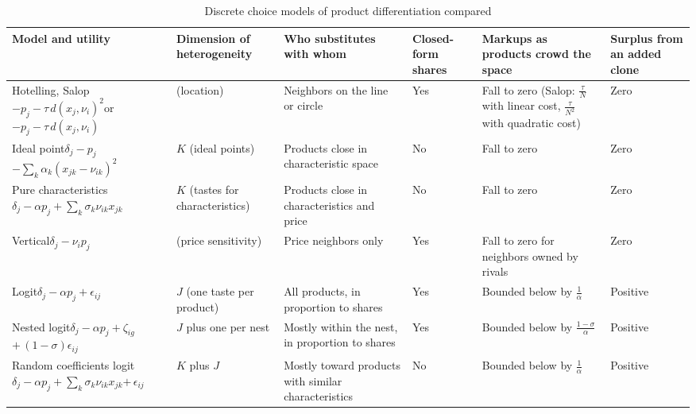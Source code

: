 \begin{table}[htbp]
\centering
\caption{Discrete choice models of product differentiation compared}\label{tab:06-taxonomy}
\footnotesize
\renewcommand{\arraystretch}{1.3}
\begin{tabularx}{\textwidth}{@{}>{\raggedright\arraybackslash}p{3.0cm}>{\raggedright\arraybackslash}p{1.55cm}>{\raggedright\arraybackslash}X>{\raggedright\arraybackslash}p{1.1cm}>{\raggedright\arraybackslash}p{2.05cm}>{\raggedright\arraybackslash}p{2.0cm}@{}}
\toprule
Model and utility & Dimension of heterogeneity & Who substitutes with whom & Closed-form shares & Markups as products crowd the space & Surplus from an added clone \\
\midrule
Hotelling, Salop\newline $-p_j - \tau\, d(x_j,\nu_i)^2$\newline or $-p_j - \tau\, d(x_j,\nu_i)$ & 1 (location) & Neighbors on the line or circle & Yes & Fall to zero (Salop: $\frac{\tau}{N}$ with linear cost, $\frac{\tau}{N^2}$ with quadratic cost) & Zero \\
Ideal point\newline $\delta_j - p_j$\newline $-\sum_k \alpha_k(x_{jk}-\nu_{ik})^2$ & $K$ (ideal points) & Products close in characteristic space & No & Fall to zero & Zero \\
Pure characteristics\newline $\delta_j - \alpha p_j + \sum_k \sigma_k\nu_{ik}x_{jk}$ & $K$ (tastes for characteristics) & Products close in characteristics and price & No & Fall to zero & Zero \\
Vertical\newline $\delta_j - \nu_i p_j$ & 1 (price sensitivity) & Price neighbors only & Yes & Fall to zero for neighbors owned by rivals & Zero \\
Logit\newline $\delta_j - \alpha p_j + \epsilon_{ij}$ & $J$ (one taste per product) & All products, in proportion to shares & Yes & Bounded below by $\frac{1}{\alpha}$ & Positive \\
Nested logit\newline $\delta_j - \alpha p_j + \zeta_{ig}$\newline $+\,(1-\sigma)\epsilon_{ij}$ & $J$ plus one per nest & Mostly within the nest, in proportion to shares & Yes & Bounded below by $\frac{1-\sigma}{\alpha}$ & Positive \\
Random coefficients logit\newline $\delta_j - \alpha p_j + \sum_k \sigma_k\nu_{ik}x_{jk}$\newline $+\,\epsilon_{ij}$ & $K$ plus $J$ & Mostly toward products with similar characteristics & No & Bounded below by $\frac{1}{\alpha}$ & Positive \\

\end{tabularx}
\end{table}
